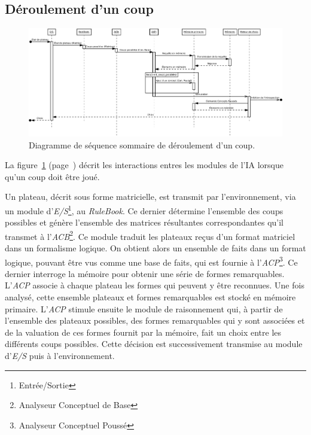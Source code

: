 \subsection{Déroulement d'un coup}
\label{deroulement_dun_coup}

\begin{figure}[p]
\centering
\includegraphics[width=0.9\textheight,angle=90]{files/analyse/sequence}
\caption{Diagramme de séquence sommaire de déroulement d'un coup.}
\label{diag_sequence_coup}
\end{figure}

La figure~\ref{diag_sequence_coup} (page~\pageref{diag_sequence_coup}) décrit les interactions entres les modules de l'IA lorsque qu'un coup doit être joué.

Un plateau, décrit sous forme matricielle, est transmit par l'environnement, via un module d'\emph{E/S}\footnote{Entrée/Sortie}, au \emph{RuleBook}. Ce dernier détermine l'ensemble des coups possibles et génère l'ensemble des matrices résultantes correspondantes qu'il transmet à l'\emph{ACB}\footnote{Analyseur Conceptuel de Base}. Ce module traduit les plateaux reçus d'un format matriciel dans un formalisme logique. On obtient alors un ensemble de faits dans un format logique, pouvant être vus comme une base de faits, qui est fournie à l'\emph{ACP}\footnote{Analyseur Conceptuel Poussé}. Ce dernier interroge la mémoire pour obtenir une série de formes remarquables. L'\emph{ACP} associe à chaque plateau les formes qui peuvent y être reconnues. Une fois analysé, cette ensemble plateaux et formes remarquables est stocké en mémoire primaire. L'\emph{ACP} stimule ensuite le module de raisonnement qui, à partir de l'ensemble des plateaux possibles, des formes remarquables qui y sont associées et de la valuation de ces formes fournit par la mémoire, fait un choix entre les différents coups possibles. Cette décision est successivement transmise au module d'\emph{E/S} puis à l'environnement.

